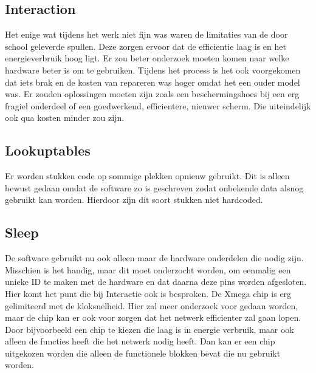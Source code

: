 \subsection{Interaction}
Het enige wat tijdens het werk niet fijn was waren de limitaties van de door school geleverde spullen. Deze zorgen ervoor dat de 
efficientie laag is en het energieverbruik hoog ligt. Er zou beter onderzoek moeten komen naar welke hardware beter is om te gebruiken.
Tijdens het process is het ook voorgekomen dat iets brak en de kosten van repareren was hoger omdat het een ouder model was. Er zouden oplossingen
moeten zijn zoals een beschermingshoes bij een erg fragiel onderdeel of een goedwerkend, efficientere, nieuwer scherm. Die uiteindelijk ook 
qua kosten minder zou zijn.

\subsection{Lookuptables}
Er worden stukken code op sommige plekken opnieuw gebruikt. Dit is alleen bewust gedaan omdat de software zo is geschreven zodat onbekende 
data alsnog gebruikt kan worden. Hierdoor zijn dit soort stukken niet hardcoded.

\subsection{Sleep}
De software gebruikt nu ook alleen maar de hardware onderdelen die nodig zijn. Misschien is het handig, maar dit moet onderzocht worden, 
om eenmalig een unieke ID te maken met de hardware en dat daarna deze pins worden afgesloten. Hier komt het punt die bij Interactie ook is 
besproken. De Xmega chip is erg gelimiteerd met de kloksnelheid. Hier zal meer onderzoek voor gedaan worden, maar de chip kan er ook voor zorgen 
dat het netwerk efficienter zal gaan lopen. Door bijvoorbeeld een chip te kiezen die laag is in energie verbruik, maar ook alleen de functies heeft die 
het netwerk nodig heeft. Dan kan er een chip uitgekozen worden die alleen de functionele blokken bevat die nu gebruikt worden.